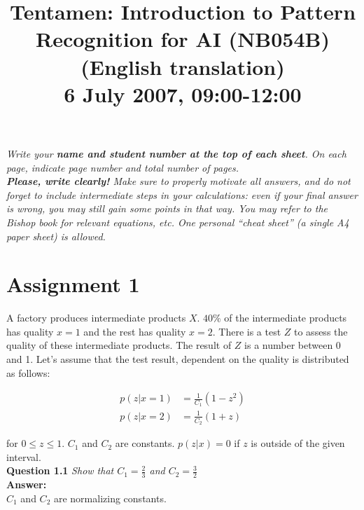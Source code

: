 \documentclass[a4paper]{article}
\begin{document}
\title{Tentamen: Introduction to Pattern Recognition for AI (NB054B)\\(English translation)\\ \vspace{1em}6 July 2007, 09:00-12:00 }
\date{}
\maketitle

\vspace{-5em}
\textit{Write your \textbf{name and student number at the top of each sheet}. On each page, indicate page number and total number of pages.\\
\textbf{Please, write clearly!} Make sure to properly motivate all answers, and do not
forget to include intermediate steps in your calculations: even if your final answer is
wrong, you may still gain some points in that way. You may refer to the Bishop book
for relevant equations, etc. One personal “cheat sheet” (a single A4 paper sheet) is
allowed.}\\





\section*{Assignment 1}

A factory produces intermediate products $X$. $40 \%$ of the intermediate products has quality $x = 1$ and the rest has quality $x = 2$. There is a test $Z$ to assess the quality of these intermediate products. The result of $Z$ is a number between 0 and 1. Let's assume that the test result, dependent on the quality is distributed as follows:

\begin{align*}
	p(z | x = 1) &= \frac{1}{C_1} (1 - z^2)\\
	p(z | x = 2) &= \frac{1}{C_2} (1 + z)
\end{align*}

for $0 \leq z \leq 1$. $C_1$ and $C_2$ are constants. $p(z | x) = 0$ if $z$ is outside of the given interval.\\

\textbf{Question 1.1}  \textit{Show that $C_1 = \frac{2}{3}$ and $C_2 = \frac{3}{2}$}\\

\textbf{Answer:}\\

$C_1$ and $C_2$ are normalizing constants.
\end{document}
